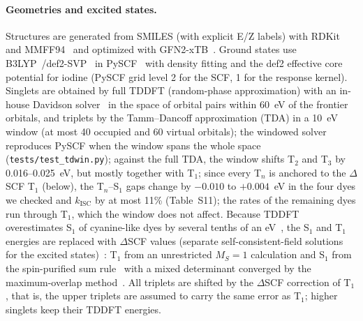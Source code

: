 \documentclass[journal=jctcce,manuscript=article]{achemso}
\newcommand{\kisc}{k_\mathrm{ISC}}
\begin{document}
\paragraph{Geometries and excited states.} Structures are generated from SMILES (with explicit E/Z
labels) with RDKit and MMFF94~\cite{Halgren1996} and optimized with GFN2-xTB~\cite{Bannwarth2019}.
Ground states use B3LYP~\cite{Becke1993,Stephens1994}/def2-SVP~\cite{Weigend2005} in
PySCF~\cite{Sun2020} with density fitting and the def2 effective core potential for iodine (PySCF grid level 2 for the SCF, 1 for
the response kernel). Singlets are obtained by full TDDFT (random-phase approximation) with an in-house
Davidson solver~\cite{Stratmann1998} in the space of orbital pairs within 60~eV of the frontier orbitals, and
triplets by the Tamm--Dancoff approximation (TDA) in a 10~eV window (at most 40 occupied and 60 virtual
orbitals); the windowed solver reproduces PySCF when the window spans the whole space
(\texttt{tests/test\_tdwin.py}); against the full TDA, the window shifts T$_2$ and T$_3$ by 0.016--0.025~eV, but mostly together
with T$_1$; since every T$_n$ is anchored to the $\Delta$SCF T$_1$ (below), the T$_n$--S$_1$ gaps change by
$-0.010$ to $+0.004$~eV in the four dyes we checked and $\kisc$ by at most 11\%
(Table~S11); the rates of the remaining dyes run through T$_1$, which the window does not affect. Because TDDFT overestimates S$_1$ of cyanine-like dyes by several tenths of
an eV~\cite{Momeni2015,LeGuennic2015}, the S$_1$ and T$_1$ energies are replaced with $\Delta$SCF
values (separate self-consistent-field solutions for the excited states)~\cite{Hait2021}: T$_1$ from an unrestricted $M_S=1$ calculation and S$_1$ from the spin-purified sum
rule~\cite{Ziegler1977} with a mixed determinant converged by the maximum-overlap
method~\cite{Gilbert2008}. All triplets are shifted by the $\Delta$SCF correction of T$_1$, that is, the upper
triplets are assumed to carry the same error as T$_1$; higher singlets keep their TDDFT energies.
\end{document}
